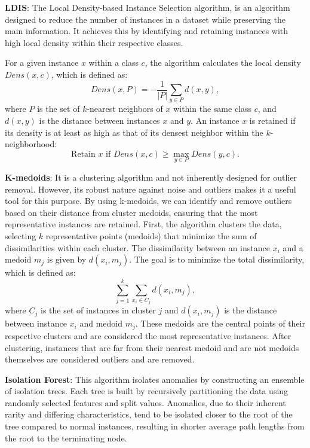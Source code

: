 \documentclass{ws-ijitdm}
\begin{document}
\begin{itemlist}
    \item \textbf{LDIS}: The Local Density-based Instance Selection algorithm\cite{32}, is an algorithm designed to reduce the number of instances in a dataset while preserving the main information. It achieves this by identifying and retaining instances with high local density within their respective classes.

    For a given instance $x$ within a class $c$, the algorithm calculates the local density $Dens(x, c)$, which is defined as:
    \[
    Dens(x, P) = -\frac{1}{|P|} \sum_{y \in P} d(x, y),
    \]
    where $P$ is the set of $k$-nearest neighbors of $x$ within the same class $c$, and $d(x, y)$ is the distance between instances $x$ and $y$. An instance $x$ is retained if its density is at least as high as that of its densest neighbor within the $k$-neighborhood:
    \[
    \text{Retain } x \text{ if } Dens(x, c) \geq \max_{y \in P} Dens(y, c).
    \]

    \item \textbf{K-medoids}: It is a clustering algorithm and not inherently designed for outlier removal\cite{33}. However, its robust nature against noise and outliers makes it a useful tool for this purpose. By using k-medoids, we can identify and remove outliers based on their distance from cluster medoids, ensuring that the most representative instances are retained\cite{34}. First, the algorithm clusters the data, selecting $k$ representative points (medoids) that minimize the sum of dissimilarities within each cluster. The dissimilarity between an instance $x_i$ and a medoid $m_j$ is given by $d(x_i, m_j)$. The goal is to minimize the total dissimilarity, which is defined as:
    \[
    \sum_{j=1}^{k} \sum_{x_i \in C_j} d(x_i, m_j),
    \]
    where $C_j$ is the set of instances in cluster $j$ and $d(x_i, m_j)$ is the distance between instance $x_i$ and medoid $m_j$. These medoids are the central points of their respective clusters and are considered the most representative instances. After clustering, instances that are far from their nearest medoid and are not medoids themselves are considered outliers and are removed.

    \item \textbf{Isolation Forest}: This algorithm isolates anomalies by constructing an ensemble of isolation trees. Each tree is built by recursively partitioning the data using randomly selected features and split values\cite{35}. Anomalies, due to their inherent rarity and differing characteristics, tend to be isolated closer to the root of the tree compared to normal instances, resulting in shorter average path lengths from the root to the terminating node. 
    

\end{itemlist}
\end{document}
